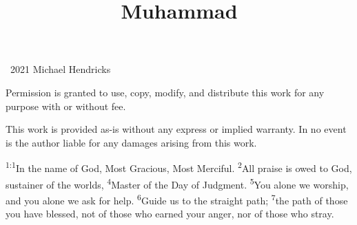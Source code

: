 \documentclass[openany,12pt,english]{book}
\title{Muhammad}
\author{}
\date{}
\newenvironment{para}{\par\pretolerance=100\tolerance=200\setlength{\emergencystretch}{0.6em}\relax}{\par}
\begin{document}
\maketitle

{
\thispagestyle{empty}
\vspace*{\fill}
\begin{changemargin}{.8in}{.8in}
\begin{center}
\textcopyright{}~2021 Michael Hendricks

\vspace{0.5\baselineskip}

Permission is granted to use, copy, modify, and distribute
this work for any purpose with or without fee.

\vspace{0.5\baselineskip}

This work is provided as-is without any express or implied
warranty. In no event is the author liable for any damages
arising from this work.
\end{center}
\end{changemargin}
}
\clearpage{}

\clearpage{}

\markboth{}{}


\begin{para}
    \textsuperscript{1:1}\thinspace{}In the name of God, Most Gra\-cious, Most Mer\-ci\-ful.
    \textsuperscript{2}\thinspace{}All praise is owed to God, sus\-tain\-er of the worlds,
    \textsuperscript{4}\thinspace{}Mas\-ter of the Day of Judg\-ment.
    \textsuperscript{5}\thinspace{}You a\-lone we wor\-ship, and you a\-lone we ask for help.
    \textsuperscript{6}\thinspace{}Guide us to the straight path;
    \textsuperscript{7}\thinspace{}the path of those you have bless\-ed, not of those who earned your an\-ger, nor of those who stray.
\end{para}

\bigskip{}
\end{document}
